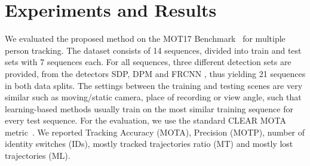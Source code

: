 \section{Experiments and Results}
\label{sec:results}
We evaluated the proposed method on the MOT17 Benchmark~\cite{MOT16} for multiple person tracking. 
The dataset consists of 14 sequences, divided into train and test sets with 7 sequences each. 
For all sequences, three different detection sets are provided, from the detectors SDP\cite{yang2016exploit}, DPM\cite{felzenszwalb2010object} and FRCNN \cite{ren2015faster}, thus yielding 21 sequences in both data splits. 
The settings between the training and testing scenes are very similar such as moving/static camera, place of recording or view angle, such that learning-based methods usually train on the most similar training sequence for every test sequence.
For the evaluation, we use the standard CLEAR MOTA metric~\cite{MOT15}. 
We reported Tracking Accuracy (MOTA), Precision (MOTP), number of identity switches (IDs), mostly tracked trajectories ratio (MT) and mostly lost trajectories (ML).

